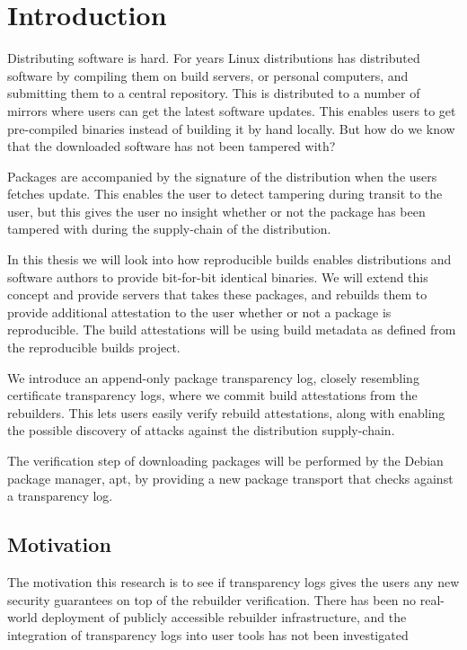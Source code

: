 \documentclass[../Main/thesis.tex]{subfiles}
\begin{document}
\chapter{Introduction}\label{ch:introduction}
Distributing software is hard. For years Linux distributions has distributed
software by compiling them on build servers, or personal computers, and
submitting them to a central repository. This is distributed to a number of
mirrors where users can get the latest software updates. This enables users to
get pre-compiled binaries instead of building it by hand locally. But how do we
know that the downloaded software has not been tampered with?

Packages are accompanied by the signature of the distribution when the users
fetches update. This enables the user to detect tampering during transit to the
user, but this gives the user no insight whether or not the package has been
tampered with during the supply-chain of the distribution.

In this thesis we will look into how reproducible builds enables distributions
and software authors to provide bit-for-bit identical binaries. We will extend
this concept and provide servers that takes these packages, and rebuilds them to
provide additional attestation to the user whether or not a package is
reproducible. The build attestations will be using build metadata as defined
from the reproducible builds project.

We introduce an append-only package transparency log, closely resembling
certificate transparency logs, where we commit build attestations from the
rebuilders. This lets users easily verify rebuild attestations, along with
enabling the possible discovery of attacks against the distribution
supply-chain.

The verification step of downloading packages will be performed by the Debian
package manager, apt, by providing a new package transport that checks against a
transparency log.


\section{Motivation}\label{sec:motivation}
The motivation this research is to see if transparency logs gives the users any
new security guarantees on top of the rebuilder verification. There has been no
real-world deployment of publicly accessible rebuilder infrastructure, and the
integration of transparency logs into user tools has not been investigated 
\end{document}
